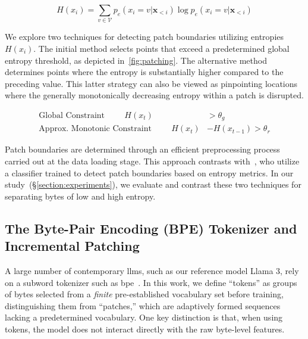 \begin{equation}
H(x_i) = \sum_{v \in \mathcal{V}} p_{e}(x_i=v|\pmb{x}_{<i}) \log p_{e}(x_i=v|\pmb{x}_{<i})
\end{equation}

We explore two techniques for detecting patch boundaries utilizing entropies $H(x_i)$. The initial method selects points that exceed a predetermined global entropy threshold, as depicted in~\autoref{fig:patching}. The alternative method determines points where the entropy is substantially higher compared to the preceding value. This latter strategy can also be viewed as pinpointing locations where the generally monotonically decreasing entropy within a patch is disrupted.

\begin{align*}
    \text{Global Constraint}\hspace{1cm}H(x_t)& > \theta_g\\
    \text{Approx. Monotonic Constraint}\hspace{1cm}H(x_t)& - H(x_{t-1}) > \theta_r
\end{align*}

Patch boundaries are determined through an efficient preprocessing process carried out at the data loading stage. This approach contrasts with~\citet{nawrot-etal-2023-efficient}, who utilize a classifier trained to detect patch boundaries based on entropy metrics. In our study~(\S\ref{section:experiments}), we evaluate and contrast these two techniques for separating bytes of low and high entropy.

\subsection{The Byte-Pair Encoding (BPE) Tokenizer and Incremental Patching}
\label{section:incremental-patching}
\label{section:bpe-patch}

A large number of contemporary llms, such as our reference model Llama 3, rely on a subword tokenizer such as bpe~\citep{gage1994new, sennrich-etal-2016-neural}. In this work, we define ``tokens'' as groups of bytes selected from a \textit{finite} pre-established vocabulary set before training, distinguishing them from ``patches,'' which are adaptively formed sequences lacking a predetermined vocabulary. One key distinction is that, when using tokens, the model does not interact directly with the raw byte-level features.

